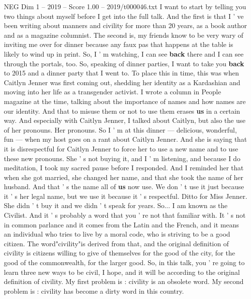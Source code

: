 \begin{textsample}{NEG Dim 1 – 2019 – Score 1.00 – 2019/t000046.txt}  \label{ex:f1_neg_024}
I want to start by telling you two things about myself before I get into the full talk.
And the first is that I ' ve been writing about manners and civility for more than 20 years, as a book author and as a magazine columnist.
The second is, my friends know to be very wary of inviting me over for dinner because any faux pas that happens at the table is likely to wind up in print.
So, I ' m watching, I can see \textbf{back} there and I can see through the portals, too.
So, speaking of dinner parties, I want to take you \textbf{back} to 2015 and a dinner party that I went to.
To place this in time, this was when Caitlyn Jenner was first coming out, shedding her identity as a Kardashian and moving into her life as a transgender activist.
I wrote a column in People magazine at the time, talking about the importance of names and how names are our identity.
And that to misuse them or not to use them erases \textbf{us} in a certain way.
And especially with Caitlyn Jenner, I talked about Caitlyn, but also the use of her pronouns.
Her pronouns.
So I ' m at this dinner — delicious, wonderful, fun — when my host goes on a rant about Caitlyn Jenner.
And she is saying that it is disrespectful for Caitlyn Jenner to force her to use a new name and to use these new pronouns.
She ' s not buying it, and I ' m listening, and because I do meditation, I took my sacred pause before I responded.
And I reminded her that when she got married, she changed her name, and that she took the name of her husband.
And that ' s the name all of \textbf{us} now use.
We don ' t use it just because it ' s her legal name, but we use it because it ' s respectful.
Ditto for Miss Jenner.
She didn ' t buy it and we didn ' t speak for years.
So...
I am known as the Civilist.
And it ' s probably a word that you ' re not that familiar with.
It ' s not in common parlance and it comes from the Latin and the French, and it means an individual who tries to live by a moral code, who is striving to be a good citizen.
The word"civility"is derived from that, and the original definition of civility is citizens willing to give of themselves for the good of the city, for the good of the commonwealth, for the larger good.
So, in this talk, you ' re going to learn three new ways to be civil, I hope, and it will be according to the original definition of civility.
My first problem is : civility is an obsolete word.
My second problem is : civility has become a dirty word in this country.

\end{textsample}
